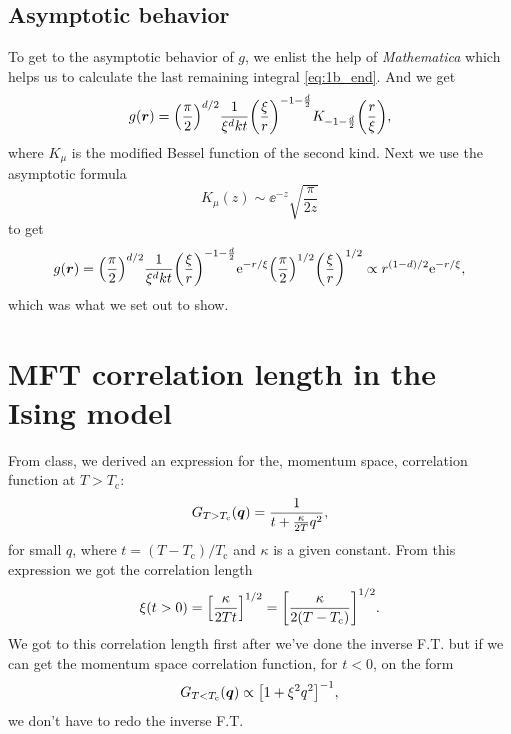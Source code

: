 \documentclass[11pt,letter, swedish, english
]{article}
\newcommand{\Tc}{\ensuremath{T_{\text{c}}}}
\begin{document}


\subsection{Asymptotic behavior}
To get to the asymptotic behavior of $g$, we enlist the help of
\textit{Mathematica} which helps us to calculate the last remaining
integral \eqref{eq:1b_end}. And we get
\begin{equation}
g(\vb*r)=\qty(\frac{\pi}{2})^{d/2}\frac{1}{\xi^dkt} 
\qty(\frac{\xi}{r})^{-1-\frac{d}{2}} 
K_{-1-\frac{d}{2}}\qty(\frac{r}{\xi}),
\end{equation}
where $K_\mu$ is the modified Bessel function of the second kind. Next
we use the asymptotic formula 
\begin{equation}
K_\mu(z)\sim \ee^{-z}\sqrt{\frac{\pi}{2z}}
\end{equation}
to get
\begin{equation}
g(\vb*r)=\qty(\frac{\pi}{2})^{d/2}\frac{1}{\xi^dkt} 
\qty(\frac{\xi}{r})^{-1-\frac{d}{2}} 
\mathrm{e}^{-r/\xi}\qty(\frac{\pi}{2})^{1/2}\qty(\frac{\xi}{r})^{1/2}
\propto
r^{(1-d)/2}\mathrm{e}^{-r/\xi},
\end{equation}
which was what we set out to show. 



\section{MFT correlation length in the Ising model}
From class, we derived an expression for the, momentum space,
correlation function at $T>\Tc$:
\begin{equation}
G_{T>\Tc}(\vb*q)=\frac{1}{t+\frac{\kappa}{2T}q^2},
\end{equation}
for small $q$, where $t=(T-\Tc)/\Tc$ and $\kappa$ is a given
constant. From this expression we got the correlation length
\begin{equation}
\xi(t>0)=\qty[\frac{\kappa}{2Tt}]^{1/2}
=\qty[\frac{\kappa}{2(T-\Tc)}]^{1/2}.
\end{equation}
We got to this correlation length first after we've done
the inverse F.T. but if we can get the momentum space correlation
function, for $t<0$, on the form
\begin{equation}
G_{T<\Tc}(\vb*q)\propto\qty[1+\xi^2q^2]^{-1},
\end{equation}
we don't have to redo the inverse F.T.
\end{document}
